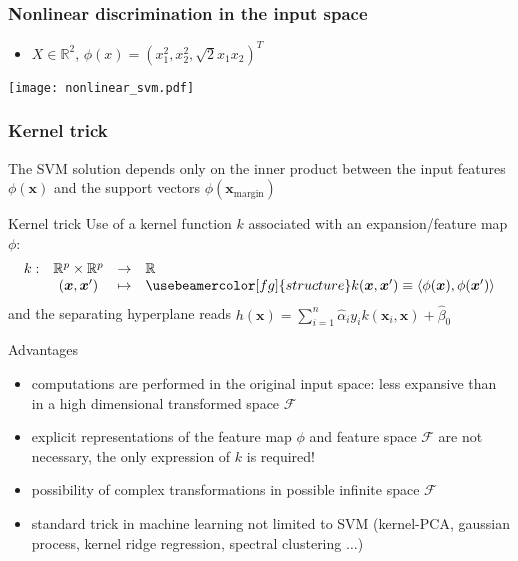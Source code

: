 \documentclass[compress, smaller, serif, 9pt]{beamer}
\newcommand{\structuretext}[1]{{\usebeamercolor[fg]{structure} #1}}
\newcommand{\doigt}{\structuretext{\noindent \Pisymbol{pzd}{43}}}
\newcommand{\bx}{{\boldsymbol{x}}}
\begin{document}
\begin{frame}
  \frametitle{Nonlinear discrimination in the input space}

\begin{itemize}
 \item  $X \in \mathbb{R}^2$, $\phi(x)= (x_1^2,x_2^2,\sqrt{2}x_1 x_2)^T$
\end{itemize}

\begin{center}
\texttt{[image: nonlinear\_svm.pdf]}\\
\end{center}


\end{frame}



\begin{frame}
  \frametitle{Kernel trick}
  
The SVM solution depends only on the \structuretext{inner product} between the input features $\phi(\bx)$ and the support vectors 
  $\phi(\bx_{\textrm{margin}})$
  
  \begin{block}{Kernel trick}
  Use of  a kernel function $k$ associated with an expansion/feature map $\phi$:
  $$\begin{array}{ccll} k:& \mathbb{R}^p \times \mathbb{R}^p  &\rightarrow& \mathbb{R}\\ 
              & (\bx,\bx') &\mapsto& \structuretext{ k (\bx,\bx') \equiv \langle \phi(\bx), \phi(\bx') \rangle}
             \end{array}$$
  and the separating hyperplane reads $h(\bx)= \sum_{i=1}^n \widehat{\alpha}_i y_i k(\bx_i,\bx)+ \widehat{\beta}_0$
  \end{block}
 
 \begin{block}{Advantages}
  \begin{itemize}
   \item computations are performed in the original input space: less  expansive than in a high 
   dimensional transformed space $\mathcal{F}$
   \item explicit representations of the feature map $\phi$ and  feature space $\mathcal{F}$ are not necessary, the only expression of $k$
   is required!
   \item[\doigt] possibility of complex transformations in possible infinite space  $\mathcal{F}$
   \item[\doigt] standard trick in machine learning not limited to SVM (kernel-PCA, gaussian process, kernel ridge regression, spectral clustering $\ldots$)
  \end{itemize}

 \end{block}


\end{frame}
\end{document}
